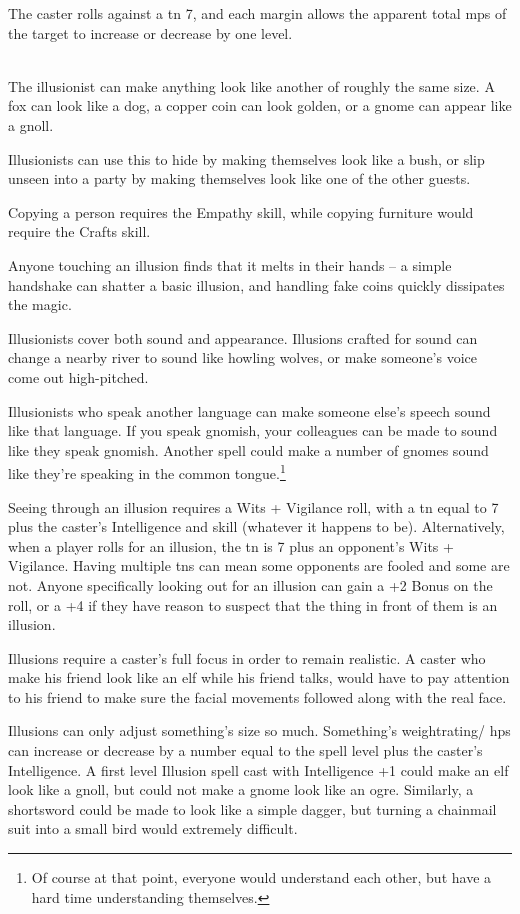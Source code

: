\begin{multicols}{2}
The caster rolls against a \gls{tn} 7, and each margin allows the apparent total \glspl{mp} of the target to increase or decrease by one level.

\\
The illusionist can make anything look like another of roughly the same size.  A fox can look like a dog, a copper coin can look golden, or a gnome can appear like a gnoll.

Illusionists can use this to hide by making themselves look like a bush, or slip unseen into a party by making themselves look like one of the other guests.

Copying a person requires the Empathy skill, while copying furniture would require the Crafts skill.

Anyone touching an illusion finds that it melts in their hands -- a simple handshake can shatter a basic illusion, and handling fake coins quickly dissipates the magic.

Illusionists cover both sound and appearance.  Illusions crafted for sound can change a nearby river to sound like howling wolves, or make someone's voice come out high-pitched.

Illusionists who speak another language can make someone else's speech sound like that language.
If you speak gnomish, your colleagues can be made to sound like they speak gnomish.
Another spell could make a number of gnomes sound like they're speaking in the common tongue.\footnote{Of course at that point, everyone would understand each other, but have a hard time understanding themselves.}

Seeing through an illusion requires a Wits + Vigilance roll, with a \gls{tn} equal to 7 plus the caster's Intelligence and skill (whatever it happens to be).  Alternatively, when a player rolls for an illusion, the \gls{tn} is 7 plus an opponent's Wits + Vigilance.  Having multiple \glspl{tn} can mean some opponents are fooled and some are not.  Anyone specifically looking out for an illusion can gain a +2 Bonus on the roll, or a +4 if they have reason to suspect that the thing in front of them is an illusion.

Illusions require a caster's full focus in order to remain realistic.
A caster who make his friend look like an elf while his friend talks, would have to pay attention to his friend to make sure the facial movements followed along with the real face.

Illusions can only adjust something's size so much.
Something's \gls{weightrating}/ \glspl{hp} can increase or decrease by a number equal to the spell level plus the caster's Intelligence.
A first level Illusion spell cast with Intelligence +1 could make an elf look like a gnoll, but could not make a gnome look like an ogre.
Similarly, a shortsword could be made to look like a simple dagger, but turning a chainmail suit into a small bird would extremely difficult.


\end{multicols}
